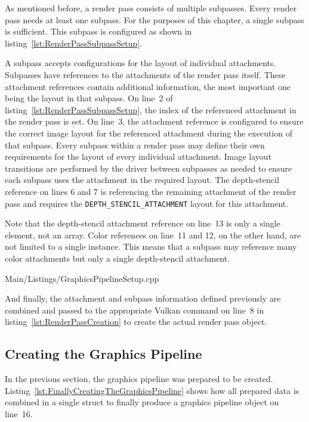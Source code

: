         As mentioned before, a render pass consists of multiple subpasses.
        Every render pass needs at least one subpass.
        For the purposes of this chapter, a single subpass is sufficient.
        This subpass is configured as shown in listing~\ref{lst:RenderPassSubpassSetup}.

        A subpass accepts configurations for the layout of individual attachments.
        Subpasses have references to the attachments of the render pass itself.
        These attachment references contain additional information, the most important one being the layout in that subpass.
        On line~2 of listing~\ref{lst:RenderPassSubpassSetup}, the index of the referenced attachment in the render pass is set.
        On line~3, the attachment reference is configured to ensure the correct image layout for the referenced attachment during the execution of that subpass.
        Every subpass within a render pass may define their own requirements for the layout of every individual attachment.
        Image layout transitions are performed by the \gls{driver} between subpasses as needed to ensure each subpass uses the attachment in the required layout.
        The depth-stencil reference on lines 6 and 7 is referencing the remaining attachment of the render pass and requires the \lstinline{DEPTH_STENCIL_ATTACHMENT} layout for this attachment.

        Note that the depth-stencil attachment reference on line~13 is only a single element, not an array.
        Color references on line~11 and 12, on the other hand, are not limited to a single instance.
        This means that a subpass may reference many color attachments but only a single depth-stencil attachment.

        
        {Main/Listings/GraphicsPipelineSetup.cpp}

        And finally, the attachment and subpass information defined previously are combined and passed to the appropriate Vulkan command on line~8 in listing~\ref{lst:RenderPassCreation} to create the actual render pass object.

    \subsection{Creating the Graphics Pipeline}
    \label{sub:ActualGraphicsPipelineCreation}
      In the previous section, the graphics pipeline was prepared to be created.
      Listing~\ref{lst:FinallyCreatingTheGraphicsPipeline} shows how all prepared data is combined in a single struct to finally produce a graphics pipeline object on line~16.

